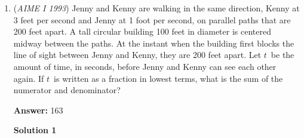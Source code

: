 \begin{enumerate}
 for $\frac {L_4}8,\frac {L_3}{16},\frac {L_2}{32}$ in a similar way, $(0,0)$ and $(0,420)$ are the only possibilities, 

 and for $\frac {L_1}{64}$, all three work. 

 


 Also, to be in the triangle, $0\le k\le560$ and $0\le m\le420$.

 
Since $L_1$ is the only point that can possibly influence the $x$ coordinate other than $P_1$, we look at that first.

 If $L_1 = (0,0)$, then $k = 2^6\cdot14 = 64\cdot14 > 40\cdot14 = 560$, 

 so it can only be that $L_1 = (560,0)$, and $k + 560 = 2^6\cdot14$
$\implies k = 64\cdot14 - 40\cdot14 = 24\cdot14 = 6\cdot56 = 336$.

 
Now, considering the $y$ coordinate, note that if any of $L_2,L_3,L_4$ are $(0,0)$ ($L_2$ would influence the least, so we test that), 

 then $\frac {L_2}{32} + \frac {L_3}{16} + \frac {L_4}8 < \frac {420}{16} + \frac {420}8 = 79\pm\epsilon < 80$, 

 which would mean that $P_1 > 2^6\cdot(92 - 80) = 64\cdot12 > 42\cdot10 = 420\ge m$, so $L_2,L_3,L_4 = (0,420)$, 

 and now $\frac {P_1}{64} + \frac {420}{2^5} + \frac {420}{2^4} + \frac {420}{2^3} = 92$
$\implies P_1$
$= 64\cdot92 - 420(2 + 4 + 8)$
$= 64\cdot92 - 420\cdot14= 64(100 - 8) - 14^2\cdot30$
$= 6400 - 512 - (200 - 4)\cdot30$
$= 6400 - 512 - 6000 + 120$
$= - 112 + 120$
$= 8$, 

 and finally, $k + m = 336 + 8 = \boxed{344}$.

 


	\item (\textit{AIME I 1993}) Jenny and Kenny are walking in the same direction, Kenny at 3 feet per second and Jenny at 1 foot per second, on parallel paths that are 200 feet apart. A tall circular building 100 feet in diameter is centered midway between the paths. At the instant when the building first blocks the line of sight between Jenny and Kenny, they are 200 feet apart. Let $t\,$ be the amount of time, in seconds, before Jenny and Kenny can see each other again. If $t\,$ is written as a fraction in lowest terms, what is the sum of the numerator and denominator?


 
 \textbf{Answer: }163



\textbf{Solution 1}


\end{enumerate}

